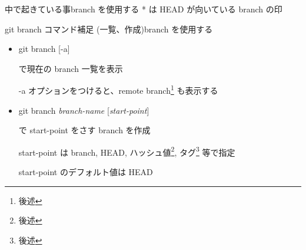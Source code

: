 \begin{frame}[t]{中で起きている事}{branch を使用する}
{{      * は HEAD が向いている branch の印
    }
  }





\end{frame}


\begin{frame}[t]{git branch コマンド補足 (一覧、作成)}{branch を使用する}

  \begin{itemize}
  \item git branch [-a]

    で現在の branch 一覧を表示

    -a オプションをつけると、remote branch\footnote{後述} も表示する
    \vspace{2ex}

  \item git branch \textit{branch-name} [\textit{start-point}]

    で start-point をさす branch を作成

    start-point は branch, HEAD, ハッシュ値\footnote{後述}, タグ\footnote{後述} 等で指定

    start-point のデフォルト値は HEAD
  \end{itemize}

\end{frame}
